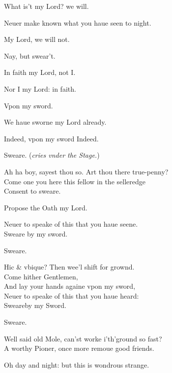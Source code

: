 \documentclass[a5paper,DIV=calc,11pt]{scrbook}
\begin{document}
\begin{drama*}
    \horspeaks What is't my Lord? we will.
    
    \hamspeaks Neuer make known what you haue seen to night.
    
     My Lord, we will not.
    
    \hamspeaks Nay, but swear't.
    
    \horspeaks In faith my Lord, not I.
    
    \marspeaks Nor I my Lord: in faith.
    
    \hamspeaks Vpon my sword.
    
    \marspeaks We haue sworne my Lord already.
    
    \hamspeaks Indeed, vpon my sword Indeed.
    
    \ghospeaks Sweare. \hfill(\textit{\gho cries vnder the Stage.})
    
    \hamspeaks Ah ha boy, sayest thou so. Art thou there true-penny?\\
    Come one you here this fellow in the selleredge\\
    Consent to sweare.
    
    \horspeaks Propose the Oath my Lord.
    
    \hamspeaks Neuer to speake of this that you haue seene.\\
    Sweare by my sword.
    
    \ghospeaks Sweare.
    
    \hamspeaks Hic \& vbique? Then wee'l shift for grownd.\\
    Come hither Gentlemen,\\
    And lay your hands againe vpon my sword,\\
    Neuer to speake of this that you haue heard:\\
    Sweareby my Sword.
    
    \ghospeaks Sweare.
    
    \hamspeaks Well said old Mole, can'st worke i'th'ground so fast?\\
    A worthy Pioner, once more remoue good friends.
    
    \horspeaks Oh day and night: but this is wondrous strange.
    

\end{drama*}
\end{document}
